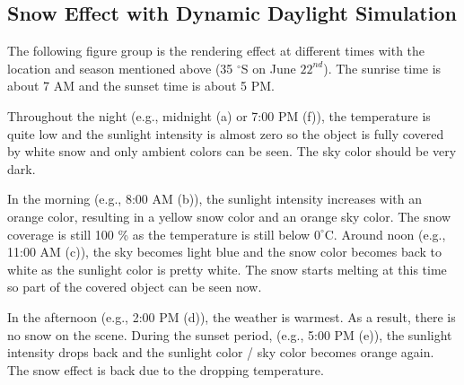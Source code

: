 \documentclass{article}
\begin{document}
\subsection {Snow Effect with Dynamic Daylight Simulation}
\label{headings}
The following figure group is the rendering effect at different times with the location and season mentioned 
above (35 $^{\circ}$S on June \(22^{nd}\)). The sunrise time is about 7 AM and the sunset time is about 5 PM.

Throughout the night (e.g., midnight (a) or 7:00 PM (f)), the temperature is quite low and the sunlight 
intensity is almost zero so the object is fully covered by white snow and only ambient colors can be seen. The
sky color should be very dark.

In the morning (e.g., 8:00 AM (b)), the sunlight intensity increases with an orange color, resulting in a yellow
snow color and an orange sky color. The snow coverage is still 100 \% as the temperature is still below 
\(0^\circ\mathrm{C}\). Around noon (e.g., 11:00 AM (c)), the sky becomes light blue and the snow color becomes 
back to white as the sunlight color is pretty white. The snow starts melting at this time so part of the covered 
object can be seen now. 

In the afternoon (e.g., 2:00 PM (d)), the weather is warmest. As a result, there is no snow on the scene. During 
the sunset period, (e.g., 5:00 PM (e)), the sunlight intensity drops back and the sunlight color / sky color becomes
orange again. The snow effect is back due to the dropping temperature.
\end{document}
